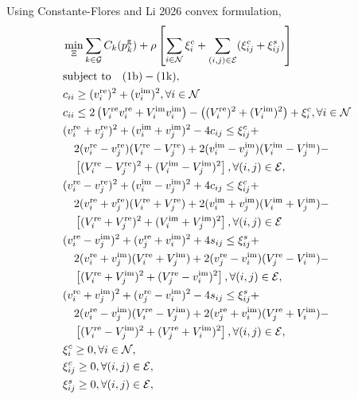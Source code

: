 \documentclass[11pt,twoside]{article}
\begin{document}
Using Constante-Flores and Li 2026 convex formulation,
\begin{subequations}
	\begin{align}
		& \min_{\Xi} \sum_{k \in \mathcal{G}} C_k(p_k^{\text{g}}) + \rho \left[ \sum_{i \in \mathcal{N}} \xi_i^c + \sum_{(i,j) \in \mathcal{E}} (\xi_{ij}^c + \xi_{ij}^s) \right] \\
		& \text{subject to} \quad (1\text{b}) - (1\text{k}), \notag \\
		& c_{ii} \geq (v_i^{\text{re}})^2 + (v_i^{\text{im}})^2, \forall i \in \mathcal{N} \\
		& c_{ii} \leq 2 \left( V_i^{\text{re}} v_i^{\text{re}} + V_i^{\text{im}} v_i^{\text{im}} \right) - \left( (V_i^{\text{re}})^2 + (V_i^{\text{im}})^2 \right) + \xi_i^c, \forall i \in \mathcal{N}\\
		& (v_i^{\text{re}} + v_j^{\text{re}})^2 + (v_i^{\text{im}} + v_j^{\text{im}})^2 - 4c_{ij} \leq \xi_{ij}^c + \notag \\
		& \quad 2(v_i^{\text{re}} - v_j^{\text{re}})(V_i^{\text{re}} - V_j^{\text{re}}) + 2(v_i^{\text{im}} - v_j^{\text{im}})(V_i^{\text{im}} - V_j^{\text{im}}) - \notag \\
		& \quad \left[ (V_i^{\text{re}} - V_j^{\text{re}})^2 + (V_i^{\text{im}} - V_j^{\text{im}})^2 \right], \forall (i, j) \in \mathcal{E}, \\
		& (v_i^{\text{re}} - v_j^{\text{re}})^2 + (v_i^{\text{im}} - v_j^{\text{im}})^2 + 4c_{ij} \leq \xi_{ij}^c + \notag \\
		& \quad 2(v_i^{\text{re}} + v_j^{\text{re}})(V_i^{\text{re}} + V_j^{\text{re}}) + 2(v_i^{\text{im}} + v_j^{\text{im}})(V_i^{\text{im}} + V_j^{\text{im}}) - \notag \\
		& \quad \left[ (V_i^{\text{re}} + V_j^{\text{re}})^2 + (V_i^{\text{im}} + V_j^{\text{im}})^2 \right], \forall (i, j) \in \mathcal{E} \\
		& (v_i^{\text{re}} - v_j^{\text{im}})^2 + (v_j^{\text{re}} + v_i^{\text{im}})^2 + 4s_{ij} \leq \xi_{ij}^s + \notag \\
		& \quad 2(v_i^{\text{re}} + v_j^{\text{im}})(V_i^{\text{re}} + V_j^{\text{im}}) + 2(v_j^{\text{re}} - v_i^{\text{im}})(V_j^{\text{re}} - V_i^{\text{im}}) - \notag \\
		& \quad \left[ (V_i^{\text{re}} + V_j^{\text{im}})^2 + (V_j^{\text{re}} - v_i^{\text{im}})^2 \right], \forall (i, j) \in \mathcal{E},\\
		& (v_i^{\text{re}} + v_j^{\text{im}})^2 + (v_j^{\text{re}} - v_i^{\text{im}})^2 - 4s_{ij} \leq \xi_{ij}^s + \notag \\
		& \quad 2(v_i^{\text{re}} - v_j^{\text{im}})(V_i^{\text{re}} - V_j^{\text{im}}) + 2(v_j^{\text{re}} + v_i^{\text{im}})(V_j^{\text{re}} + V_i^{\text{im}}) - \notag \\
		& \quad \left[ (V_i^{\text{re}} - V_j^{\text{im}})^2 + (V_j^{\text{re}} + V_i^{\text{im}})^2 \right], \forall (i, j) \in \mathcal{E},  \\
		& \xi_i^c \geq 0, \forall i \in \mathcal{N},\\
		& \xi_{ij}^c \geq 0, \forall (i, j) \in \mathcal{E},  \\
		& \xi_{ij}^s \geq 0, \forall (i, j) \in \mathcal{E},
	\end{align}
\end{subequations}
\end{document}
